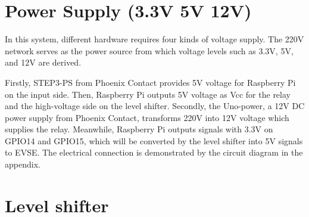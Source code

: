 \documentclass[
	english,
	ruledheaders=section,%
	class=report,%
	thesis={type=Report},%
	accentcolor=9c,%
	custommargins=true,%
	marginpar=false,%
	parskip=half-,%
	fontsize=11pt,%
	logofile={img/tuda_logo.pdf}, %
]{tudapub}
\begin{document}

\section{Power Supply (3.3V 5V 12V)}
\label{sec: power supply}

In this system, different hardware requires four kinds of voltage supply. The 220V network serves as the power source from which voltage levels such as 3.3V, 5V, and 12V are derived. 

Firstly,  STEP3-PS from Phoenix Contact provides 5V voltage for Raspberry Pi on the input side. Then, Raspberry Pi outputs 5V voltage as Vcc for the relay and the high-voltage side on the level shifter. Secondly, the Uno-power, a 12V DC power supply from Phoenix Contact, transforms 220V into 12V voltage which supplies the relay. Meanwhile, Raspberry Pi outputs signals with 3.3V on GPIO14 and GPIO15, which will be converted by the level shifter into 5V signals to EVSE. The electrical connection is demonstrated by the circuit diagram in the appendix.



\section{Level shifter}
\label{sec: level shifter}
\end{document}

